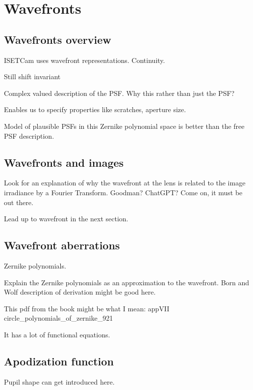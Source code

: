 \documentclass[
  letterpaper,
]{book}
\begin{document}
\chapter{Wavefronts}\label{sec-optics-wavefront}

\section{Wavefronts overview}\label{sec-optics-wavefront-overview}

ISETCam uses wavefront representations. Continuity.

Still shift invariant

Complex valued description of the PSF. Why this rather than just the
PSF?

Enables us to specify properties like scratches, aperture size.

Model of plausible PSFs in this Zernike polynomial space is better than
the free PSF description.

\section{Wavefronts and images}\label{wavefronts-and-images}

Look for an explanation of why the wavefront at the lens is related to
the image irradiance by a Fourier Transform. Goodman? ChatGPT? Come on,
it must be out there.

Lead up to wavefront in the next section.

\section{Wavefront aberrations}\label{wavefront-aberrations}

Zernike polynomials.

Explain the Zernike polynomials as an approximation to the wavefront.
Born and Wolf description of derivation might be good here.

This pdf from the book might be what I mean: appVII
circle\_polynomials\_of\_zernike\_921

It has a lot of functional equations.

\section{Apodization function}\label{apodization-function}

Pupil shape can get introduced here.
\end{document}
